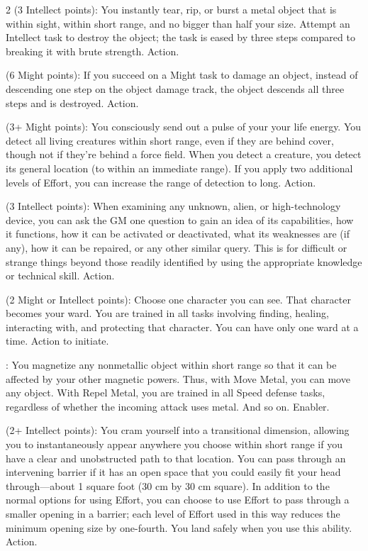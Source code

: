 \begin{multicols}{2}
 (3 Intellect points): You instantly tear, rip, or burst a metal object that is within sight, within short range, and no bigger than half your size. Attempt an Intellect task to destroy the object; the task is eased by three steps compared to breaking it with brute strength. Action. 

 (6 Might points): If you succeed on a Might task to damage an object, instead of descending one step on the object damage track, the object descends all three steps and is destroyed. Action. 

 (3+ Might points): You consciously send out a pulse of your your life energy. You detect all living creatures within short range, even if they are behind cover, though not if they’re behind a force field. When you detect a creature, you detect its general location (to within an immediate range). If you apply two additional levels of Effort, you can increase the range of detection to long. Action. 

 (3 Intellect points): When examining any unknown, alien, or high-technology device, you can ask the GM one question to gain an idea of its capabilities, how it functions, how it can be activated or deactivated, what its weaknesses are (if any), how it can be repaired, or any other similar query. This is for difficult or strange things beyond those readily identified by using the appropriate knowledge or technical skill. Action. 

 (2 Might or Intellect points): Choose one character you can see. That character becomes your ward. You are trained in all tasks involving finding, healing, interacting with, and protecting that character. You can have only one ward at a time. Action to initiate. 

: You magnetize any nonmetallic object within short range so that it can be affected by your other magnetic powers. Thus, with Move Metal, you can move any object. With Repel Metal, you are trained in all Speed defense tasks, regardless of whether the incoming attack uses metal. And so on. Enabler. 

 (2+ Intellect points): You cram yourself into a transitional dimension, allowing you to instantaneously appear anywhere you choose within short range if you have a clear and unobstructed path to that location. You can pass through an intervening barrier if it has an open space that you could easily fit your head through—about 1 square foot (30 cm by 30 cm square). In addition to the normal options for using Effort, you can choose to use Effort to pass through a smaller opening in a barrier; each level of Effort used in this way reduces the minimum opening size by one-fourth. You land safely when you use this ability. Action.


\end{multicols}
